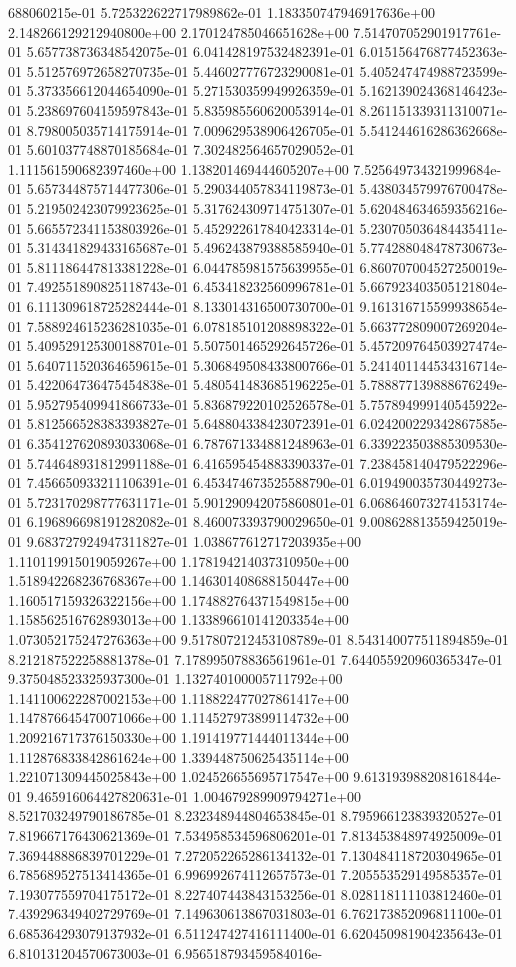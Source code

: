 688060215e-01	5.725322622717989862e-01	1.183350747946917636e+00	2.148266129212940800e+00	2.170124785046651628e+00	7.514707052901917761e-01	5.657738736348542075e-01	6.041428197532482391e-01	6.015156476877452363e-01	5.512576972658270735e-01	5.446027776723290081e-01	5.405247474988723599e-01	5.373356612044654090e-01	5.271530359949926359e-01	5.162139024368146423e-01	5.238697604159597843e-01	5.835985560620053914e-01	8.261151339311310071e-01	8.798005035714175914e-01	7.009629538906426705e-01	5.541244616286362668e-01	5.601037748870185684e-01	7.302482564657029052e-01	1.111561590682397460e+00	1.138201469444605207e+00	7.525649734321999684e-01	5.657344875714477306e-01	5.290344057834119873e-01	5.438034579976700478e-01	5.219502423079923625e-01	5.317624309714751307e-01	5.620484634659356216e-01	5.665572341153803926e-01	5.452922617840423314e-01	5.230705036484435411e-01	5.314341829433165687e-01	5.496243879388585940e-01	5.774288048478730673e-01	5.811186447813381228e-01	6.044785981575639955e-01	6.860707004527250019e-01	7.492551890825118743e-01	6.453418232560996781e-01	5.667923403505121804e-01	6.111309618725282444e-01	8.133014316500730700e-01	9.161316715599938654e-01	7.588924615236281035e-01	6.078185101208898322e-01	5.663772809007269204e-01	5.409529125300188701e-01	5.507501465292645726e-01	5.457209764503927474e-01	5.640711520364659615e-01	5.306849508433800766e-01	5.241401144534316714e-01	5.422064736475454838e-01	5.480541483685196225e-01	5.788877139888676249e-01	5.952795409941866733e-01	5.836879220102526578e-01	5.757894999140545922e-01	5.812566528383393827e-01	5.648804338423072391e-01	6.024200229342867585e-01	6.354127620893033068e-01	6.787671334881248963e-01	6.339223503885309530e-01	5.744648931812991188e-01	6.416595454883390337e-01	7.238458140479522296e-01	7.456650933211106391e-01	6.453474673525588790e-01	6.019490035730449273e-01	5.723170298777631171e-01	5.901290942075860801e-01	6.068646073274153174e-01	6.196896698191282082e-01	8.460073393790029650e-01	9.008628813559425019e-01	9.683727924947311827e-01	1.038677612717203935e+00	1.110119915019059267e+00	1.178194214037310950e+00	1.518942268236768367e+00	1.146301408688150447e+00	1.160517159326322156e+00	1.174882764371549815e+00	1.158562516762893013e+00	1.133896610141203354e+00	1.073052175247276363e+00	9.517807212453108789e-01	8.543140077511894859e-01	8.212187522258881378e-01	7.178995078836561961e-01	7.644055920960365347e-01	9.375048523325937300e-01	1.132740100005711792e+00	1.141100622287002153e+00	1.118822477027861417e+00	1.147876645470071066e+00	1.114527973899114732e+00	1.209216717376150330e+00	1.191419771444011344e+00	1.112876833842861624e+00	1.339448750625435114e+00	1.221071309445025843e+00	1.024526655695717547e+00	9.613193988208161844e-01	9.465916064427820631e-01	1.004679289909794271e+00	8.521703249790186785e-01	8.232348944804653845e-01	8.795966123839320527e-01	7.819667176430621369e-01	7.534958534596806201e-01	7.813453848974925009e-01	7.369448886839701229e-01	7.272052265286134132e-01	7.130484118720304965e-01	6.785689527513414365e-01	6.996992674112657573e-01	7.205553529149585357e-01	7.193077559704175172e-01	8.227407443843153256e-01	8.028118111103812460e-01	7.439296349402729769e-01	7.149630613867031803e-01	6.762173852096811100e-01	6.685364293079137932e-01	6.511247427416111400e-01	6.620450981904235643e-01	6.810131204570673003e-01	6.956518793459584016e-